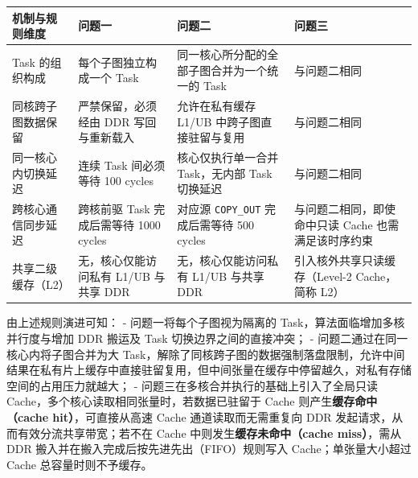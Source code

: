 \documentclass[anonymous,notoc]{gmcm2026}
\begin{document}
{\def\LTcaptype{table} %
\begin{table}[!htbp]\centering\small
\begin{tabular}{@{}
  >{\raggedright\arraybackslash}p{}
  >{\raggedright\arraybackslash}p{}
  >{\raggedright\arraybackslash}p{}
  >{\raggedright\arraybackslash}p{}@{}}
\toprule\noalign{}
\begin{minipage}[b]{\linewidth}\raggedright
机制与规则维度
\end{minipage} & \begin{minipage}[b]{\linewidth}\raggedright
问题一
\end{minipage} & \begin{minipage}[b]{\linewidth}\raggedright
问题二
\end{minipage} & \begin{minipage}[b]{\linewidth}\raggedright
问题三
\end{minipage} \\
\midrule\noalign{}


Task 的组织构成 & 每个子图独立构成一个 Task & 同一核心所分配的全部子图合并为一个统一的 Task & 与问题二相同 \\
同核跨子图数据保留 & 严禁保留，必须经由 DDR 写回与重新载入 & 允许在私有缓存 L1/UB 中跨子图直接驻留与复用 & 与问题二相同 \\
同一核心内切换延迟 & 连续 Task 间必须等待 100 cycles & 核心仅执行单一合并 Task，无内部 Task 切换延迟 & 与问题二相同 \\
跨核心通信同步延迟 & 跨核前驱 Task 完成后需等待 1000 cycles & 对应源 \texttt{COPY\_OUT} 完成后需等待 500 cycles & 与问题二相同，即使命中只读 Cache 也需满足该时序约束 \\
共享二级缓存（L2） & 无，核心仅能访问私有 L1/UB 与共享 DDR & 无，核心仅能访问私有 L1/UB 与共享 DDR & 引入核外共享只读缓存（Level-2 Cache，简称 L2） \\
\bottomrule\end{tabular}
\end{table}
}

由上述规则演进可知： - 问题一将每个子图视为隔离的 Task，算法面临增加多核并行度与增加 DDR 搬运及 Task 切换边界之间的直接冲突； - 问题二通过在同一核心内将子图合并为大 Task，解除了同核跨子图的数据强制落盘限制，允许中间结果在私有片上缓存中直接驻留复用，但中间张量在缓存中停留越久，对私有存储空间的占用压力就越大； - 问题三在多核合并执行的基础上引入了全局只读 Cache，多个核心读取相同张量时，若数据已驻留于 Cache 则产生\textbf{缓存命中（cache hit）}，可直接从高速 Cache 通道读取而无需重复向 DDR 发起请求，从而有效分流共享带宽；若不在 Cache 中则发生\textbf{缓存未命中（cache miss）}，需从 DDR 搬入并在搬入完成后按先进先出（FIFO）规则写入 Cache；单张量大小超过 Cache 总容量时则不予缓存。
\end{document}
